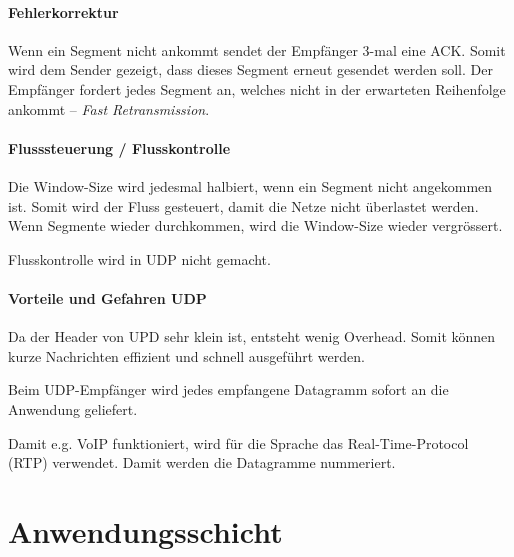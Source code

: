 \documentclass[a4paper,12pt]{article}
\begin{document}
\paragraph{Fehlerkorrektur} Wenn ein Segment nicht ankommt sendet der Empfänger 3-mal eine ACK. Somit wird dem Sender gezeigt, dass dieses Segment erneut gesendet werden soll. Der Empfänger fordert jedes Segment an, welches nicht in der erwarteten Reihenfolge ankommt -- \emph{Fast Retransmission}.

\paragraph{Flusssteuerung / Flusskontrolle} Die Window-Size wird jedesmal halbiert, wenn ein Segment nicht angekommen ist. Somit wird der Fluss gesteuert, damit die Netze nicht überlastet werden. Wenn Segmente wieder durchkommen, wird die Window-Size wieder vergrössert.

Flusskontrolle wird in UDP nicht gemacht.

\paragraph{Vorteile und Gefahren UDP} Da der Header von UPD sehr klein ist, entsteht wenig Overhead. Somit können kurze Nachrichten effizient und schnell ausgeführt werden.

Beim UDP-Empfänger wird jedes empfangene Datagramm sofort an die Anwendung geliefert.


Damit e.g. VoIP funktioniert, wird für die Sprache das Real-Time-Protocol (RTP) verwendet. Damit werden die Datagramme nummeriert.






\section{Anwendungsschicht}
\end{document}
